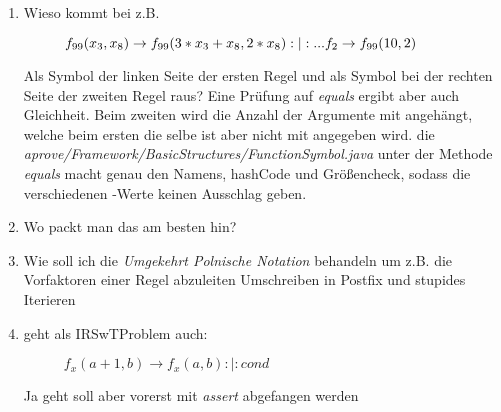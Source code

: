 \begin{enumerate}
	\item Wieso kommt bei z.B.
		\begin{figure}[H]
			\centering
			$f_{99}(x_3, x_8) \rightarrow f_{99}(3 * x_3 + x_8, 2 * x_8) :|: ... \newline
			f_2 \rightarrow f_{99}(10, 2)$
		\end{figure}
		Als Symbol der linken Seite der ersten Regel  und als Symbol bei der rechten Seite der zweiten Regel  raus? Eine Prüfung auf \emph{equals} ergibt aber auch Gleichheit. \idea Beim zweiten wird die Anzahl der Argumente mit angehängt, welche beim ersten die selbe ist aber nicht mit angegeben wird. \answer die \emph{aprove/Framework/BasicStructures/FunctionSymbol.java} unter der Methode \emph{equals} macht genau den Namens, hashCode und Größencheck, sodass die verschiedenen -Werte keinen Ausschlag geben.
	\item Wo packt man das  am besten hin?
	\item Wie soll ich die \emph{Umgekehrt Polnische Notation} behandeln um z.B. 
		  die Vorfaktoren einer Regel abzuleiten \answer Umschreiben in Postfix und stupides Iterieren
	\item geht als IRSwTProblem auch:
		\begin{figure}[H]
			\centering
			$f_x(a+1,b) \rightarrow f_x(a,b) :|: cond$
		\end{figure}
		\answer Ja geht soll aber vorerst mit \emph{assert} abgefangen werden
\end{enumerate}